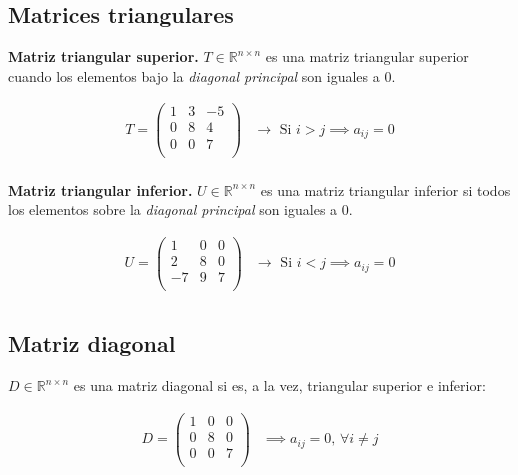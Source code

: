 \documentclass[12pt]{article}
\begin{document}
\subsection{Matrices triangulares}

\textbf{Matriz triangular superior.}
\(T \in \mathbb{R}^{n \times n}\) es una matriz triangular superior
cuando los elementos bajo la \textit{diagonal principal} son iguales a 0.

\begin{align*}
  T = \begin{pmatrix}
        1 & 3 & -5 \\
        0 & 8 & 4  \\
        0 & 0 & 7  \\
      \end{pmatrix} & \rightarrow \text{ Si } i > j \implies a_{ij} = 0 \\
\end{align*}

\textbf{Matriz triangular inferior.}
\(U \in \mathbb{R}^{n \times n}\) es una matriz triangular inferior si
todos los elementos sobre la \textit{diagonal principal} son iguales a 0.

\begin{align*}
  U = \begin{pmatrix}
        1  & 0 & 0 \\
        2  & 8 & 0 \\
        -7 & 9 & 7 \\
      \end{pmatrix} & \rightarrow \text{ Si } i < j \implies a_{ij} = 0 \\
\end{align*}

\subsection{Matriz diagonal}
\(D \in \mathbb{R}^{n \times n}\) es una matriz diagonal si es,
a la vez,
triangular superior e inferior:

\begin{align*}
  D = \begin{pmatrix}
        1 & 0 & 0 \\
        0 & 8 & 0 \\
        0 & 0 & 7 \\
      \end{pmatrix} & \implies a_{ij} = 0 \text{, } \forall i \neq j \\
\end{align*}
\end{document}
